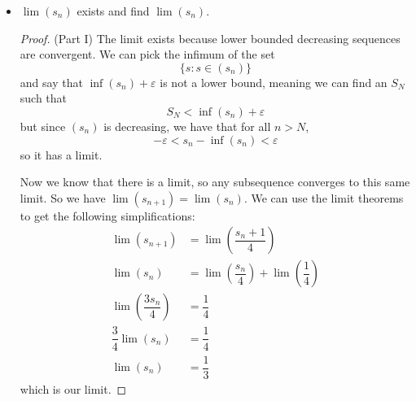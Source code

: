 \documentclass{article}
\begin{document}
\begin{itemize}
        \item $\lim(s_{n})$ exists and find $\lim(s_{n})$. 
            \begin{proof}
                (Part I) The limit exists because lower bounded decreasing sequences are convergent. We can pick the infimum of the set 
                    \begin{equation*}
                        \{s : s \in (s_{n})\}
                    \end{equation*}
                and say that $\mathop{inf}(s_{n}) + \varepsilon$ is not a lower bound, meaning we can find an $S_{N}$ such that
                    \begin{equation*}
                        S_{N} < \mathop{inf}(s_{n}) + \varepsilon
                    \end{equation*}
                but since $(s_{n})$ is decreasing, we have that for all $n > N$,
                    \begin{equation*}
                        -\varepsilon < s_{n} - \mathop{inf}(s_{n}) < \varepsilon
                    \end{equation*}
                so it has a limit.

                Now we know that there is a limit, so any subsequence converges to this same limit. So we have $\lim(s_{n + 1}) = \lim(s_{n})$. We can use the limit theorems to get the following simplifications:
                    \begin{align*}
                        \lim(s_{n + 1})         &= \lim(\dfrac{s_{n} + 1}{4})                  \\
                        \lim(s_{n})             &= \lim(\dfrac{s_{n}}{4}) + \lim(\dfrac{1}{4}) \\
                        \lim(\dfrac{3s_{n}}{4}) &= \dfrac{1}{4}                                \\
                        \dfrac{3}{4}\lim(s_{n}) &= \dfrac{1}{4}                                \\
                        \lim(s_{n})             &= \dfrac{1}{3}                                  
                    \end{align*}
                which is our limit.
            \end{proof}
    \end{itemize}
\end{document}
